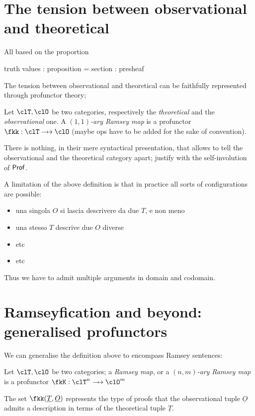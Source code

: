 \documentclass[a4paper]{../birkjour}
\begin{document}
\section{The tension between observational and theoretical}
\label{sec:orge11c3c4}
All based on the proportion

truth values : proposition = section : presheaf

The tension between observational and theoretical can be faithfully represented through profunctor theory;
\begin{definition}
  Let $\clT,\clO$ be two categories, respectively the \emph{theoretical} and the \emph{observational} one. A \emph{$(1,1)$-ary Ramsey map} is a profunctor $\fkk : \clT \pto \clO$ (maybe ops have to be added for the sake of convention).
\end{definition}
There is nothing, in their mere syntactical presentation, that allows to tell the observational and the theoretical category apart; justify with the self-involution of $\mathsf{Prof}$.

A limitation of the above definition is that in practice all sorts of configurations are possible:
\begin{itemize}
  \item una singola $O$ si lascia descrivere da due $T$, e non meno
  \item una stesso $T$ descrive due $O$ diverse
  \item etc
  \item etc
\end{itemize}
Thus we have to admit multiple arguments in domain and codomain.
\section{Ramseyfication and beyond: generalised profunctors}
\label{sec:org50db6c2}
We can generalise the definition above to encompass Ramsey sentences:
\begin{definition}
  Let $\clT,\clO$ be two categories; a \emph{Ramsey map}, or a \emph{$(n,m)$-ary Ramsey map} is a profunctor $\fkK : \clT^n \pto \clO^m$
\end{definition}
The set $\fkk(\underline T, \underline O)$ represents the type of proofs that the observational tuple $\underline O$ admits a description in terms of the theoretical tuple $\underline T$.
\end{document}
